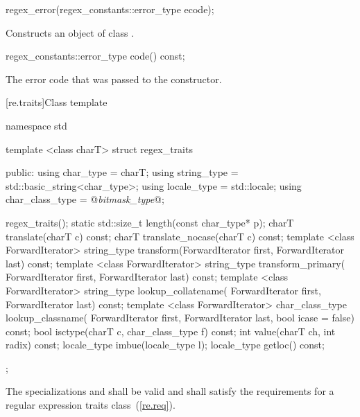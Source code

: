 %
\begin{itemdecl}
regex_error(regex_constants::error_type ecode);
\end{itemdecl}

\begin{itemdescr}
\pnum\effects  Constructs an object of class .

\pnum\postcondition  {}
\end{itemdescr}

%
%
\begin{itemdecl}
regex_constants::error_type code() const;
\end{itemdecl}

\begin{itemdescr}
\pnum\returns  The error code that was passed to the constructor.
\end{itemdescr}

[re.traits]{Class template }
%
\begin{codeblock}
namespace std {
  template <class charT>
  struct regex_traits {
  public:
     using char_type       = charT;
     using string_type     = std::basic_string<char_type>;
     using locale_type     = std::locale;
     using char_class_type = @{\itshape bitmask_type}@;

     regex_traits();
     static std::size_t length(const char_type* p);
     charT translate(charT c) const;
     charT translate_nocase(charT c) const;
     template <class ForwardIterator>
       string_type transform(ForwardIterator first, ForwardIterator last) const;
     template <class ForwardIterator>
       string_type transform_primary(
         ForwardIterator first, ForwardIterator last) const;
     template <class ForwardIterator>
       string_type lookup_collatename(
         ForwardIterator first, ForwardIterator last) const;
     template <class ForwardIterator>
       char_class_type lookup_classname(
         ForwardIterator first, ForwardIterator last, bool icase = false) const;
     bool isctype(charT c, char_class_type f) const;
     int value(charT ch, int radix) const;
     locale_type imbue(locale_type l);
     locale_type getloc() const;
  };
}
\end{codeblock}

\pnum
{}%
%
%
The specializations  and
 shall be valid and shall satisfy the
requirements for a regular expression traits class~(\ref{re.req}).

